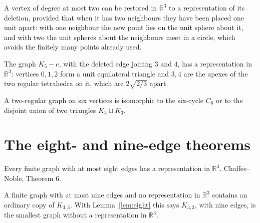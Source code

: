 \begin{lemma}
  \label{lem:reattach}
  \leanok
  A vertex of degree at most two can be restored in $\mathbb{R}^3$ to a representation of its
  deletion, provided that when it has two neighbours they have been placed one unit apart:
  with one neighbour the new point lies on the unit sphere about it, and with two the unit
  spheres about the neighbours meet in a circle, which avoids the finitely many points
  already used.
\end{lemma}

\begin{lemma}
  \label{lem:k5-minus-edge}
  \leanok
  The graph $K_5 - e$, with the deleted edge joining $3$ and $4$, has a representation in
  $\mathbb{R}^3$: vertices $0, 1, 2$ form a unit equilateral triangle and $3, 4$ are the
  apexes of the two regular tetrahedra on it, which are $2\sqrt{2/3}$ apart.
\end{lemma}

\begin{lemma}
  \label{lem:two-regular-six}
  \leanok
  A two-regular graph on six vertices is isomorphic to the six-cycle $C_6$ or to the disjoint
  union of two triangles $K_3 \sqcup K_3$.
\end{lemma}

\section{The eight- and nine-edge theorems}

\begin{lemma}
  \label{lem:eight}
  \leanok
  Every finite graph with at most eight edges has a representation in $\mathbb{R}^3$.
  Chaffee--Noble, Theorem 6.
\end{lemma}

\begin{lemma}
  \label{lem:nine}
  \leanok
  A finite graph with at most nine edges and no representation in $\mathbb{R}^3$ contains an
  ordinary copy of $K_{3,3}$. With Lemma~\ref{lem:eight} this says $K_{3,3}$, with nine
  edges, is the smallest graph without a representation in $\mathbb{R}^3$.
\end{lemma}

